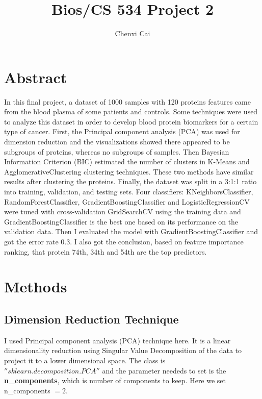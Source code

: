 \documentclass{article}
\title{Bios/CS 534 Project 2}
\author{Chenxi Cai}
\begin{document}
\maketitle

\section{Abstract}
In this final project, a dataset of 1000 samples with 120 proteins features came from the blood plasma of some patients and controls. Some techniques were used to analyze this dataset in order to develop blood protein biomarkers for a certain type of cancer. First, the Principal component analysis (PCA) was used for dimension reduction and the visualizations showed there appeared to be subgroups of proteins, whereas no subgroups of samples. Then Bayesian Information Criterion (BIC) estimated the number of clusters in K-Means and AgglomerativeClustering clustering techniques. These two methods have similar results after clustering the proteins. Finally, the dataset was split in a 3:1:1 ratio into training, validation, and testing sets. Four classifiers:  KNeighborsClassifier, RandomForestClassifier, GradientBoostingClassifier and LogisticRegressionCV were tuned with cross-validation GridSearchCV using the training data and GradientBoostingClassifier is the best one based on its performance on the validation data. Then I evaluated the model with GradientBoostingClassifier and got the error rate 0.3. I also got the conclusion, based on feature importance ranking, that protein 74th, 34th and 54th are the top predictors. 

\section{Methods}
\subsection{Dimension Reduction Technique }
I used Principal component analysis (PCA) technique here. It is a linear dimensionality reduction using Singular Value Decomposition of the data to project it to a lower dimensional space.\cite{halko2011finding} The class is $''sklearn.decomposition.PCA''$ and the parameter neededs to set is the 
\textbf{n\_components}, which is number of components to keep. Here we set n\_components $= 2$.
\end{document}
